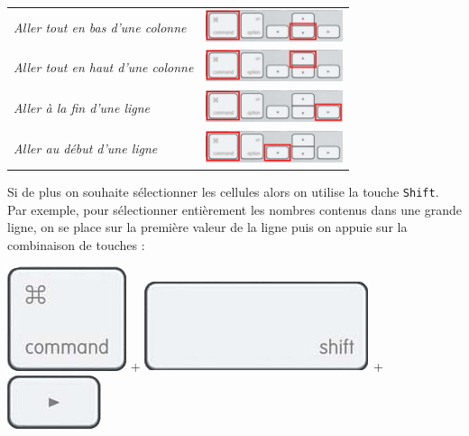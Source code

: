 \begin{center}
\begin{tabular}{ll}
\textsl{Aller tout en bas d'une colonne} & \includegraphics[width=4cm]{./images/tableur03/clavierCmDdown} \\     
\textsl{Aller tout en haut d'une colonne} & \includegraphics[width=4cm]{./images/tableur03/clavierCmDup} \\  
\textsl{Aller à la fin d'une ligne} & \includegraphics[width=4cm]{./images/tableur03/clavierCmDright} \\  
\textsl{Aller au début d'une ligne} & \includegraphics[width=4cm]{./images/tableur03/clavierCmDleft} \\  
\end{tabular}
\end{center}


Si de plus on souhaite sélectionner les cellules alors on utilise la touche \texttt{Shift}. Par exemple, pour sélectionner entièrement les nombres contenus dans une grande ligne, on se place sur la première valeur de la ligne puis on appuie sur la combinaison de touches :

\begin{center}
\includegraphics[scale=1.5]{./images/tableur03/clavierCmd}  + \includegraphics[scale=1.5]{./images/tableur03/clavierShift} + \includegraphics[scale=1.5]{./images/tableur03/clavierRight}
\end{center}


